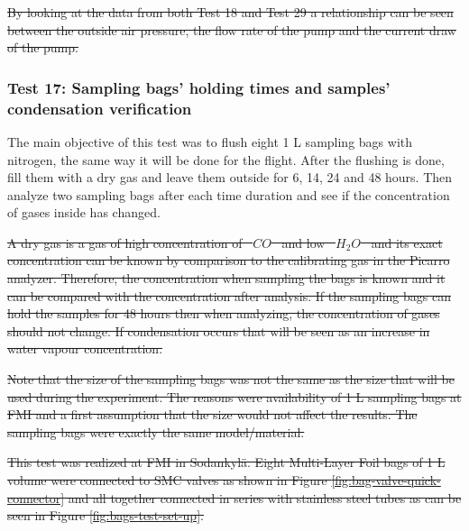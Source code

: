 \documentclass[a4paper,12pt,twoside]{article}
\providecommand{\DIFdeltex}[1]{{\protect\color{red}\sout{#1}}}                      %
\providecommand{\DIFdelbegin}{} %
\providecommand{\DIFdelend}{} %
\providecommand{\DIFdel}[1]{\texorpdfstring{\DIFdeltex{#1}}{}} %
\newcommand{\DIFscaledelfig}{0.5}
\newlength{\DIFdelgraphicswidth} %
\newlength{\DIFdelgraphicsheight} %
\newcommand{\DIFdelincludegraphics}[2][]{%
\sbox{\DIFdelgraphicsbox}{\DIFOincludegraphics[#1]{#2}}%
\settoboxwidth{\DIFdelgraphicswidth}{\DIFdelgraphicsbox} %
\settoboxtotalheight{\DIFdelgraphicsheight}{\DIFdelgraphicsbox} %
\scalebox{\DIFscaledelfig}{%
\parbox[b]{\DIFdelgraphicswidth}{\usebox{\DIFdelgraphicsbox}\\[-\baselineskip] \rule{\DIFdelgraphicswidth}{0em}}\llap{\resizebox{\DIFdelgraphicswidth}{\DIFdelgraphicsheight}{%
\setlength{\unitlength}{\DIFdelgraphicswidth}%
\begin{picture}(1,1)%
\thicklines\linethickness{2pt} %
{\color[rgb]{1,0,0}\put(0,0){\framebox(1,1){}}}%
{\color[rgb]{1,0,0}\put(0,0){\line( 1,1){1}}}%
{\color[rgb]{1,0,0}\put(0,1){\line(1,-1){1}}}%
\end{picture}%
}\hspace*{3pt}}} %
} %
\DeclareRobustCommand{\DIFdelbegin}{\DIFOdelbegin \let\includegraphics\DIFdelincludegraphics} %
\DeclareRobustCommand{\DIFdelend}{\DIFOaddend \let\includegraphics\DIFOincludegraphics} %
\begin{document}
\DIFdel{By looking at the data from both Test 18 and Test 29 a relationship can be seen between the outside air pressure, the flow rate of the pump and the current draw of the pump. 
}%

\DIFdelend \subsubsection{Test 17: Sampling bags' holding times and samples' condensation verification}
\label{sec:test17result}

The main objective of this test was to flush eight 1 L sampling bags with nitrogen, the same way it will be done for the flight. After the flushing is done, fill them with a dry gas and leave them outside for 6, 14, 24 and 48 hours. Then analyze two sampling bags after each time duration and see if the concentration of gases inside has changed. 

\DIFdelbegin \DIFdel{A dry gas is a gas of high concentration of \mbox{%
$CO$
}%
and low \mbox{%
$H_2O$
}%
and its exact concentration can be known by comparison to the calibrating gas in the Picarro analyzer. Therefore, the concentration when sampling the bags is known and it can be compared with the concentration after analysis. If the sampling bags can hold the samples for 48 hours then when analyzing, the concentration of gases should not change. If condensation occurs that will be seen as an increase in water vapour concentration. 
}%

\DIFdel{Note that the size of the sampling bags was not the same as the size that will be used during the experiment. The reasons were availability of 1 L sampling bags at FMI and a first assumption that the size would not affect the results. The sampling bags were exactly the same model/material.
}%

\DIFdel{This test was realized at FMI in Sodankyl\"{a}. Eight Multi-Layer Foil bags of 1 L volume were connected to SMC valves as shown in Figure \ref{fig:bag-valve-quick-connector} and all together connected in series with stainless steel tubes as can be seen in Figure \ref{fig:bags-test-set-up}.
}%
\end{document}
